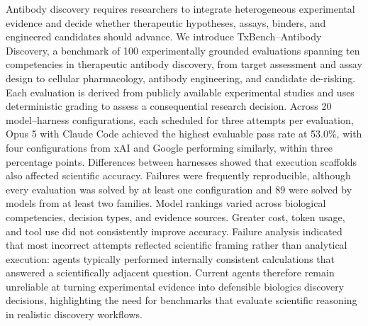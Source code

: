 \documentclass[10pt,letterpaper]{article}
\begin{document}
\PreprintHeader

\begin{PreprintAbstract}
Antibody discovery requires researchers to integrate heterogeneous experimental evidence and decide whether therapeutic hypotheses, assays, binders, and engineered candidates should advance. We introduce TxBench--Antibody Discovery, a benchmark of 100 experimentally grounded evaluations spanning ten competencies in therapeutic antibody discovery, from target assessment and assay design to cellular pharmacology, antibody engineering, and candidate de-risking. Each evaluation is derived from publicly available experimental studies and uses deterministic grading to assess a consequential research decision. Across 20 model–harness configurations, each scheduled for three attempts per evaluation, Opus 5 with Claude Code achieved the highest evaluable pass rate at 53.0\%, with four configurations from xAI and Google performing similarly, within three percentage points. Differences between harnesses showed that execution scaffolds also affected scientific accuracy. Failures were frequently reproducible, although every evaluation was solved by at least one configuration and 89 were solved by models from at least two families. Model rankings varied across biological competencies, decision types, and evidence sources. Greater cost, token usage, and tool use did not consistently improve accuracy. Failure analysis indicated that most incorrect attempts reflected scientific framing rather than analytical execution: agents typically performed internally consistent calculations that answered a scientifically adjacent question. Current agents therefore remain unreliable at turning experimental evidence into defensible biologics discovery decisions, highlighting the need for benchmarks that evaluate scientific reasoning in realistic discovery workflows.
\end{PreprintAbstract}

\vfill
\end{document}
